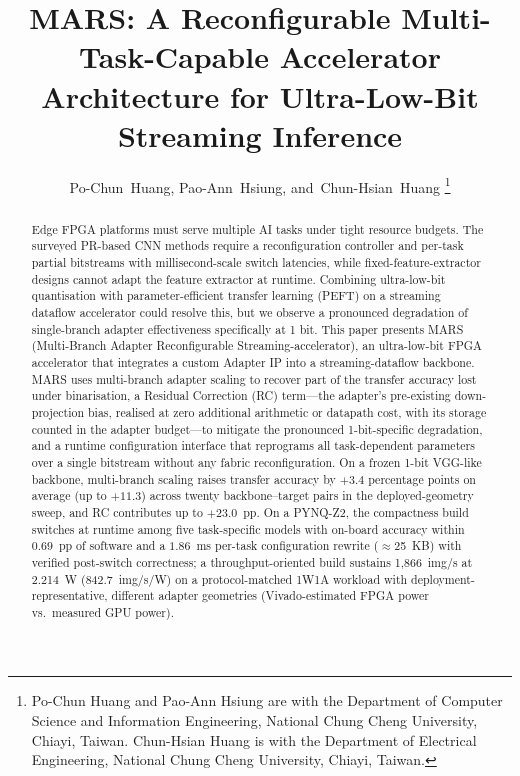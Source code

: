 \documentclass[journal]{IEEEtran}
\begin{document}
\title{MARS: A Reconfigurable Multi-Task-Capable Accelerator Architecture for Ultra-Low-Bit Streaming Inference}

\author{Po-Chun~Huang, Pao-Ann~Hsiung, and~Chun-Hsian~Huang%
\thanks{Po-Chun Huang and Pao-Ann Hsiung are with the Department of Computer Science and Information Engineering, National Chung Cheng University, Chiayi, Taiwan. Chun-Hsian Huang is with the Department of Electrical Engineering, National Chung Cheng University, Chiayi, Taiwan.}}

\maketitle

\begin{abstract}
Edge FPGA platforms must serve multiple AI tasks under tight resource budgets. The surveyed PR-based CNN methods require a reconfiguration controller and per-task partial bitstreams with millisecond-scale switch latencies, while fixed-feature-extractor designs cannot adapt the feature extractor at runtime. Combining ultra-low-bit quantisation with parameter-efficient transfer learning (PEFT) on a streaming dataflow accelerator could resolve this, but we observe a pronounced degradation of single-branch adapter effectiveness specifically at 1 bit. This paper presents MARS (Multi-Branch Adapter Reconfigurable Streaming-accelerator), an ultra-low-bit FPGA accelerator that integrates a custom Adapter IP into a streaming-dataflow backbone. MARS uses multi-branch adapter scaling to recover part of the transfer accuracy lost under binarisation, a Residual Correction (RC) term---the adapter's pre-existing down-projection bias, realised at zero additional arithmetic or datapath cost, with its storage counted in the adapter budget---to mitigate the pronounced 1-bit-specific degradation, and a runtime configuration interface that reprograms all task-dependent parameters over a single bitstream without any fabric reconfiguration. On a frozen 1-bit VGG-like backbone, multi-branch scaling raises transfer accuracy by $+3.4$ percentage points on average (up to $+11.3$) across twenty backbone--target pairs in the deployed-geometry sweep, and RC contributes up to $+23.0$~pp. On a PYNQ-Z2, the compactness build switches at runtime among five task-specific models with on-board accuracy within $0.69$~pp of software and a $1.86$~ms per-task configuration rewrite ($\approx$25~KB) with verified post-switch correctness; a throughput-oriented build sustains 1{,}866~img/s at 2.214~W (842.7~img/s/W) on a protocol-matched 1W1A workload with deployment-representative, different adapter geometries (Vivado-estimated FPGA power vs.\ measured GPU power).
\end{abstract}
\end{document}
